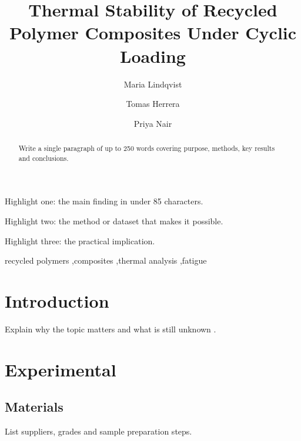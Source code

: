 \documentclass[preprint,12pt]{elsarticle}
\begin{document}
\begin{frontmatter}

\title{Thermal Stability of Recycled Polymer Composites Under Cyclic Loading}

\author[a]{Maria Lindqvist}
\author[a,b]{Tomas Herrera}
\author[b]{Priya Nair}



\begin{abstract}
Write a single paragraph of up to 250 words covering purpose, methods, key results and conclusions.
\end{abstract}

\begin{highlights}
\item Highlight one: the main finding in under 85 characters.
\item Highlight two: the method or dataset that makes it possible.
\item Highlight three: the practical implication.
\end{highlights}

\begin{keyword}
recycled polymers \sep composites \sep thermal analysis \sep fatigue
\end{keyword}

\end{frontmatter}

\section{Introduction}
\label{sec:intro}
Explain why the topic matters and what is still unknown \cite{ref1}.

\section{Experimental}
\label{sec:exp}
\subsection{Materials}
List suppliers, grades and sample preparation steps.
\end{document}
